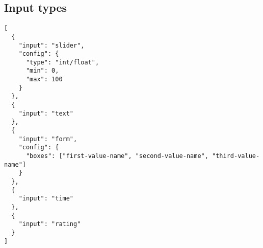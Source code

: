 \documentclass{article}
\begin{document}
\newpage
\subsection{Input types}

\begin{verbatim}
[
  {
    "input": "slider",
    "config": {
      "type": "int/float",
      "min": 0,
      "max": 100
    }
  },
  {
    "input": "text"
  },
  {
    "input": "form",
    "config": {
      "boxes": ["first-value-name", "second-value-name", "third-value-name"]
    }
  },
  {
    "input": "time"
  },
  {
    "input": "rating"
  }
]
\end{verbatim}
\end{document}
